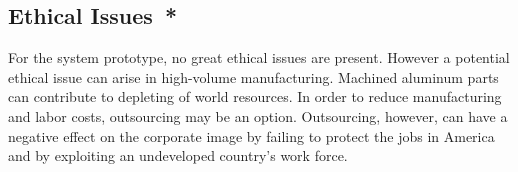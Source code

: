 \subsection*{Ethical Issues{{\color{red}\ *}}}
For the system prototype, no great ethical issues are present. However a potential ethical issue can arise in high-volume manufacturing. Machined aluminum parts can contribute to depleting of world resources. In order to reduce manufacturing and labor costs, outsourcing may be an option. Outsourcing, however, can have a negative effect on the corporate image by failing to protect the jobs in America and by exploiting an undeveloped country's work force.